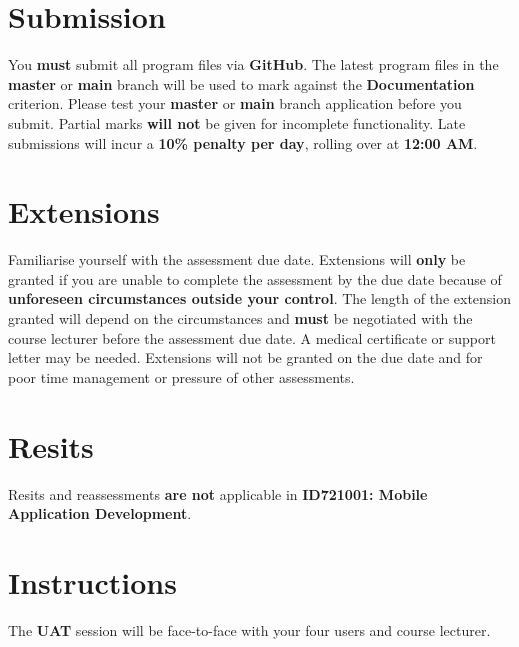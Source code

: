 \documentclass{article}
\begin{document}
\section*{Submission}
You \textbf{must} submit all program files via \textbf{GitHub}. The latest program files in the \textbf{master} or \textbf{main} branch will be used to mark against the \textbf{Documentation} criterion. Please test your \textbf{master} or \textbf{main} branch application before you submit. Partial marks \textbf{will not} be given for incomplete functionality. Late submissions will incur a \textbf{10\% penalty per day}, rolling over at \textbf{12:00 AM}.

\section*{Extensions}
Familiarise yourself with the assessment due date. Extensions will \textbf{only} be granted if you are unable to complete the assessment by the due date because of \textbf{unforeseen circumstances outside your control}. The length of the extension granted will depend on the circumstances and \textbf{must} be negotiated with the course lecturer before the assessment due date. A medical certificate or support letter may be needed. Extensions will not be granted on the due date and for poor time management or pressure of other assessments.

\section*{Resits}
Resits and reassessments \textbf{are not} applicable in \textbf{ID721001: Mobile Application Development}.

\section*{Instructions}

The \textbf{UAT} session will be face-to-face with your four users and course lecturer.
\end{document}
